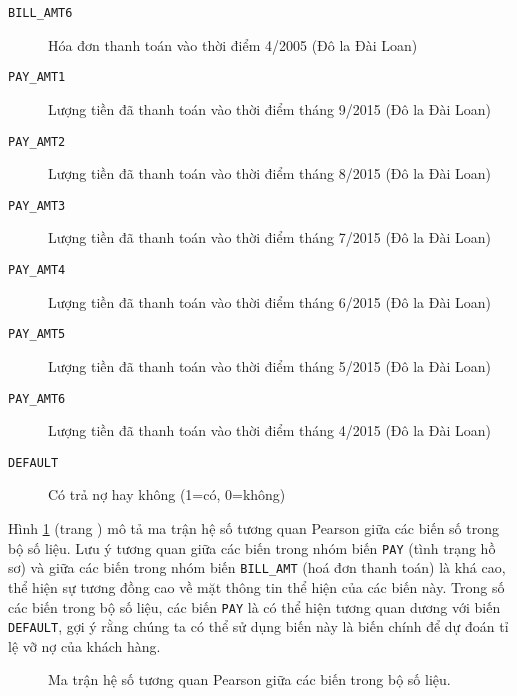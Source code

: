 \begin{description}
  \item [\texttt{BILL\_AMT6}] Hóa đơn thanh toán vào thời điểm 4/2005 (Đô la Đài Loan)
  \item [\texttt{PAY\_AMT1}] Lượng tiền đã thanh toán vào thời điểm tháng 9/2015 (Đô la Đài Loan)
  \item [\texttt{PAY\_AMT2}] Lượng tiền đã thanh toán vào thời điểm tháng 8/2015 (Đô la Đài Loan)
  \item [\texttt{PAY\_AMT3}] Lượng tiền đã thanh toán vào thời điểm tháng 7/2015 (Đô la Đài Loan)
  \item [\texttt{PAY\_AMT4}] Lượng tiền đã thanh toán vào thời điểm tháng 6/2015 (Đô la Đài Loan)
  \item [\texttt{PAY\_AMT5}] Lượng tiền đã thanh toán vào thời điểm tháng 5/2015 (Đô la Đài Loan)
  \item [\texttt{PAY\_AMT6}] Lượng tiền đã thanh toán vào thời điểm tháng 4/2015 (Đô la Đài Loan)
  \item [\texttt{DEFAULT}] Có trả nợ hay không (1=có, 0=không)
\end{description}


Hình \ref{fig:corr_mat} (trang \pageref{fig:corr_mat}) mô tả ma trận hệ số tương quan Pearson giữa các biến số trong bộ số liệu. 
Lưu ý tương quan giữa các biến trong nhóm biến \texttt{PAY} (tình trạng hồ sơ) và 
giữa các biến trong nhóm biến \texttt{BILL\_AMT} (hoá đơn thanh toán) là khá cao, thể hiện sự tương đồng cao về mặt thông tin thể hiện của các biến này.
Trong số các biến trong bộ số liệu, các biến \texttt{PAY} là có thể hiện tương quan dương với biến \texttt{DEFAULT}, gợi ý rằng chúng ta có thể sử dụng biến này là biến chính để dự đoán tỉ lệ vỡ nợ của khách hàng.

\begin{figure}[h]
\centering
\capstart
\begin{knitrout}
\color{fgcolor}\begin{kframe}


{\ttfamily\noindent\bfseries{}}\end{kframe}
\end{knitrout}
\caption[Ma trận hệ số tương quan Pearson]{Ma trận hệ số tương quan Pearson giữa các biến trong bộ số liệu.}
\label{fig:corr_mat}
\end{figure}

